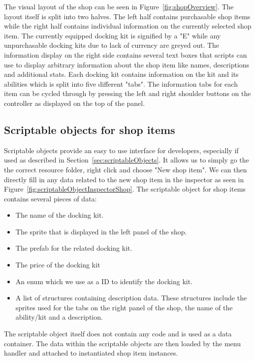 The visual layout of the shop can be seen in Figure~\ref{fig:shopOverview}. The layout itself is split into two halves. 
The left half contains purchasable shop items while the right half contains individual information on the currently selected shop item. The currently equipped docking kit is signified by a "E" while any unpurchasable docking kits due to lack of currency are greyed out. 
The information display on the right side contains several text boxes that scripts can use to display arbitrary information about the shop item like names, descriptions and additional stats. Each docking kit contains information on the kit and its abilities which is split into five different "tabs". The information tabs for each item can be cycled through by pressing the left and right shoulder buttons on the controller as displayed on the top of the panel.

\subsection{Scriptable objects for shop items}
\label{sec:scriptableObjectsShop}
Scriptable objects provide an easy to use interface for developers, especially if used as described in Section~\ref{sec:scriptableObjects}. It allows us to simply go the the correct resource folder, right click and choose "New shop item". We can then directly fill in any data related to the new shop item in the inspector as seen in Figure~\ref{fig:scriptableObjectInspectorShop}. 
The scriptable object for shop items contains several pieces of data:
\begin{itemize}
    \item The name of the docking kit.
    \item The sprite that is displayed in the left panel of the shop.
    \item The prefab for the related docking kit.
    \item The price of the docking kit
    \item An enum which we use as a ID to identify the docking kit.
    \item A list of structures containing description data. These structures include the sprites used for the tabs on the right panel of the shop, the name of the ability/kit and a description. 
\end{itemize}

The scriptable object itself does not contain any code and is used as a data container. The data within the scriptable objects are then loaded by the menu handler and attached to instantiated shop item instances. 

